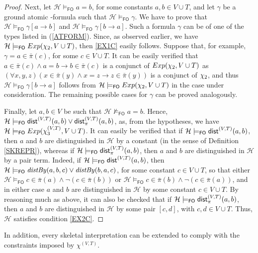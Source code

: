 \documentclass[manyauthors]{fundam}
\newcommand{\HExp}{Exp}
\newcommand{\pair}[2]{[#1,#2]}
\newcommand{\nonpairin}[2]{#1 \in \bar{\pi}(#2)}
\newcommand{\seteq}[2]{#1=#2}
\newcommand{\consta}{a}
\newcommand{\constb}{b}
\newcommand{\constc}{c}
\newcommand{\subst}[3]{#1[#2\rightarrow#3]}
\newcommand{\hinter}{\ensuremath{\mathcal{H}}}
\newcommand{\fomodels}[2]{#1 \models_{\mathsf{FO}} #2}
\newcommand{\notfomodels}[2]{#1 \not\models_{\mathsf{FO}} #2}
\begin{document}
\begin{proof}
Next, let $\fomodels{\hinter}{\seteq{\consta}{\constb}}$, for some
constants
$\consta, \constb \in V \cup T$, and let $\gamma$ be a ground
atomic \Forallpizero-formula such that $\fomodels{\hinter}{\gamma}$. We have to prove
that $\fomodels{\hinter}{\subst{\gamma}{\consta}{\constb}}$ and
$\fomodels{\hinter}{\subst{\gamma}{\constb}{\consta}}$. Such a formula $\gamma$
can be of one of the types listed in (\ref{ATFORM}). 
Since, as observed earlier, we have 
$\fomodels{\hinter}{\HExp(\exonef, V \cup T)}$, then \ref{EX1C} easily 
follows. Suppose that, for example, $\gamma=\nonpairin{\consta}{\constc}$, 
for some $\constc \in V \cup T$. It can be easily verified that
$\nonpairin{\consta}{\constc} \wedge \seteq{\consta}{\constb} \rightarrow
\nonpairin{\constb}{\constc}$  is a conjunct of $\HExp(\exonef, V \cup T)$
as $(\forall x, y, z)(\nonpairin{x}{y} \wedge \seteq{x}{z} 
\rightarrow \nonpairin{z}{y})$ is a conjunct of $\chi_2$,
and thus $\fomodels{\hinter}{\subst{\gamma}{\constb}{\consta}}$
follows from $\fomodels{\hinter}{\HExp(\exonef, V \cup T)}$ in the case
under consideration. The
remaining possible cases for $\gamma$ can be proved analogously.

Finally, let $\consta, \constb \in V$ be such that 
$\notfomodels{\hinter}{\seteq{\consta}{\constb}}$. Hence,
$\fomodels{\hinter}{\distS^{(V,T)}(\consta,\constb) \vee 
\distPS^{(V,T)}(\consta,\constb)}$, as, from the hypotheses, we have
$\fomodels{\hinter}{\HExp(\extwof, V \cup T)}$. It can easily be 
verified that if 
$\fomodels{\hinter}{\distS^{(V,T)}(\consta,\constb)}$,
then $\consta$ and $\constb$ are distinguished in $\hinter$ by a 
constant (in the sense of Definition \ref{SKREPR}), whereas if
$\fomodels{\hinter}{\distPS^{(V,T)}(\consta,\constb)}$, then 
$\consta$ and $\constb$ are distinguished in $\hinter$ by a pair term.
Indeed, if $\fomodels{\hinter}{\distS^{(V,T)}(\consta,\constb)}$, 
then $\fomodels{\hinter}{\distby{\consta}{\constb}{\constc} \vee
\distby{\constb}{\consta}{\constc}}$, for some constant $\constc \in 
V \cup T$, so that either 
$\fomodels{\hinter}{\nonpairin{\constc}{\consta} \wedge 
\neg(\nonpairin{\constc}{\constb})}$
or $\fomodels{\hinter}{\nonpairin{\constc}{\constb} 
\wedge\neg(\nonpairin{\constc}{\consta})}$, and in either case 
$\consta$ and
$\constb$ are distinguished in $\hinter$ by some constant $\constc 
\in V \cup T$. By reasoning much as
above, it can also be checked that if 
$\fomodels{\hinter}{\distPS^{(V,T)}(\consta,\constb)}$, then 
$\consta$ and $\constb$ are
distinguished in $\hinter$ by some pair $\pair{\constc}{d}$, with 
$\constc, d \in V \cup T$.
Thus, $\hinter$ satisfies condition \ref{EX2C}. %
\end{proof}
%
In addition, every skeletal interpretation can be extended to
comply with the constraints imposed by $\chi^{(V,T)}$.
\end{document}
